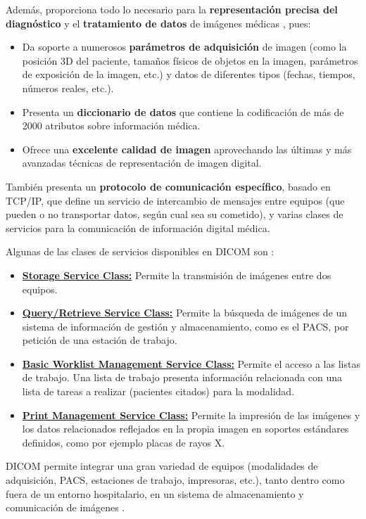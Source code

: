 Además, proporciona todo lo necesario para la \textbf{representación precisa del diagnóstico} y el \textbf{tratamiento de datos} de imágenes médicas \cite{10}, pues:
\begin{itemize}
\item Da soporte a numerosos \textbf{parámetros de adquisición} de imagen (como la posición 3D del paciente, tamaños físicos de objetos en la imagen, parámetros de exposición de la imagen, etc.) y datos de diferentes tipos (fechas, tiempos, números reales, etc.).
\item Presenta un \textbf{diccionario de datos} que contiene la codificación de más de 2000 atributos sobre información médica.
\item Ofrece una \textbf{excelente calidad de imagen} aprovechando las últimas y más avanzadas técnicas de representación de imagen digital.
\end{itemize}

También presenta un \textbf{protocolo de comunicación específico}, basado en TCP/IP, que define un servicio de intercambio de mensajes entre equipos (que pueden o no transportar datos, según cual sea su cometido), y varias clases de servicios para la comunicación de información digital médica.

Algunas de las clases de servicios disponibles en \acs{DICOM} son \cite{1}:
\begin{itemize}
\item \textbf{\underline{Storage Service Class:}} Permite la transmisión de imágenes entre dos equipos.
\item \textbf{\underline{Query/Retrieve Service Class:}} Permite la búsqueda de imágenes de un sistema de información de gestión y almacenamiento, como es el \acs{PACS}, por petición de una estación de trabajo.
\item \textbf{\underline{Basic Worklist Management Service Class:}} Permite el acceso a las listas de trabajo. Una lista de trabajo presenta información relacionada con una lista de tareas a realizar (pacientes citados) para la modalidad.
\item \textbf{\underline{Print Management Service Class:}} Permite la impresión de las imágenes y los datos relacionados reflejados en la propia imagen en soportes estándares definidos, como por ejemplo placas de rayos X.
\end{itemize}

\acs{DICOM} permite integrar una gran variedad de equipos (modalidades de adquisición, \acs{PACS}, estaciones de trabajo, impresoras, etc.), tanto dentro como fuera de un entorno hospitalario, en un sistema de almacenamiento y comunicación de imágenes \cite{10}
\cite{11}.


